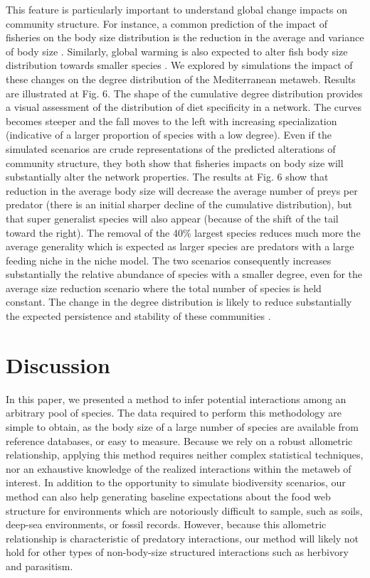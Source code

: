 \documentclass[12pt]{article}
\begin{document}
This feature is particularly important to understand global change impacts on
community structure. For instance, a common prediction of the impact of
fisheries on the body size distribution is the reduction in the average and
variance of body size \parencite{Jackson2001}. Similarly, global warming is also
expected to alter fish body size distribution towards smaller species
\parencite{Cheung2012}. We explored by simulations the impact of these changes
on the degree distribution of the Mediterranean metaweb. Results are illustrated
at Fig. 6. The shape of the cumulative degree distribution provides a visual
assessment of the distribution of diet specificity in a network. The curves
becomes steeper and the fall moves to the left with increasing specialization
(indicative of a larger proportion of species with a low degree). Even if the
simulated scenarios are crude representations of the predicted alterations of
community structure, they both show that fisheries impacts on body size will
substantially alter the network properties. The results at Fig. 6 show that
reduction in the average body size will decrease the average number of preys per
predator (there is an initial sharper decline of the cumulative distribution),
but that super generalist species will also appear (because of the shift of the
tail toward the right). The removal of the 40\% largest species reduces much
more the average generality which is expected as larger species are predators
with a large feeding niche in the niche model. The two scenarios consequently
increases substantially the relative abundance of species with a smaller degree,
even for the average size reduction scenario where the total number of species
is held constant. The change in the degree distribution is likely to reduce
substantially the expected persistence and stability of these communities
\parencite{Gravel2011a, Gravel2011b}.

\section{Discussion}

In this paper, we presented a method to infer potential interactions among an
arbitrary pool of species. The data required to perform this methodology are
simple to obtain, as the body size of a large number of species are available
from reference databases, or easy to measure. Because we rely on a robust
allometric relationship, applying this method requires neither complex
statistical techniques, nor an exhaustive knowledge of the realized interactions
within the metaweb of interest. In addition to the opportunity to simulate
biodiversity scenarios, our method can also help generating baseline
expectations about the food web structure for environments which are notoriously
difficult to sample, such as soils, deep-sea environments, or fossil records.
However, because this allometric relationship is characteristic of predatory
interactions, our method will likely not hold for other types of non-body-size
structured interactions such as herbivory and parasitism.
\end{document}
